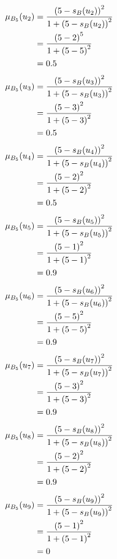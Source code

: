 \documentclass[a4paper]{book}
\begin{document}
				\begin{align}
					\mu_{B_5}(u_2) &= \frac{\left(5-s_B(u_2)\right)^2}{1 + \left(5-s_B(u_2)\right)^2}\\
					&= \frac{\left(5-2\right)^5}{1 + \left(5-5\right)^2} \notag \\
					&= 0.5 \notag
				\end{align}
				\begin{align}
					\mu_{B_5}(u_3) &= \frac{\left(5-s_B(u_3)\right)^2}{1 + \left(5-s_B(u_3)\right)^2}\\
					&= \frac{\left(5-3\right)^2}{1 + \left(5-3\right)^2} \notag \\
					&= 0.5 \notag
				\end{align}
				\begin{align}
					\mu_{B_5}(u_4) &= \frac{\left(5-s_B(u_4)\right)^2}{1 + \left(5-s_B(u_4)\right)^2}\\
					&= \frac{\left(5-2\right)^2}{1 + \left(5-2\right)^2} \notag \\
					&= 0.5 \notag
				\end{align}
				\begin{align}
					\mu_{B_5}(u_5) &= \frac{\left(5-s_B(u_5)\right)^2}{1 + \left(5-s_B(u_5)\right)^2}\\
					&= \frac{\left(5-1\right)^2}{1 + \left(5-1\right)^2} \notag \\
					&= 0.9 \notag
				\end{align}
				\begin{align}
					\mu_{B_5}(u_6) &= \frac{\left(5-s_B(u_6)\right)^2}{1 + \left(5-s_B(u_6)\right)^2}\\
					&= \frac{\left(5-5\right)^2}{1 + \left(5-5\right)^2} \notag \\
					&= 0.9 \notag
				\end{align}
				\begin{align}
					\mu_{B_5}(u_7) &= \frac{\left(5-s_B(u_7)\right)^2}{1 + \left(5-s_B(u_7)\right)^2}\\
					&= \frac{\left(5-3\right)^2}{1 + \left(5-3\right)^2} \notag \\
					&= 0.9 \notag
				\end{align}
				\begin{align}
					\mu_{B_5}(u_8) &= \frac{\left(5-s_B(u_8)\right)^2}{1 + \left(5-s_B(u_8)\right)^2}\\
					&= \frac{\left(5-2\right)^2}{1 + \left(5-2\right)^2} \notag \\
					&= 0.9 \notag
				\end{align}
				\begin{align}
					\mu_{B_5}(u_9) &= \frac{\left(5-s_B(u_9)\right)^2}{1 + \left(5-s_B(u_9)\right)^2}\\
					&= \frac{\left(5-1\right)^2}{1 + \left(5-1\right)^2} \notag \\
					&= 0 \notag
				\end{align}
\end{document}
